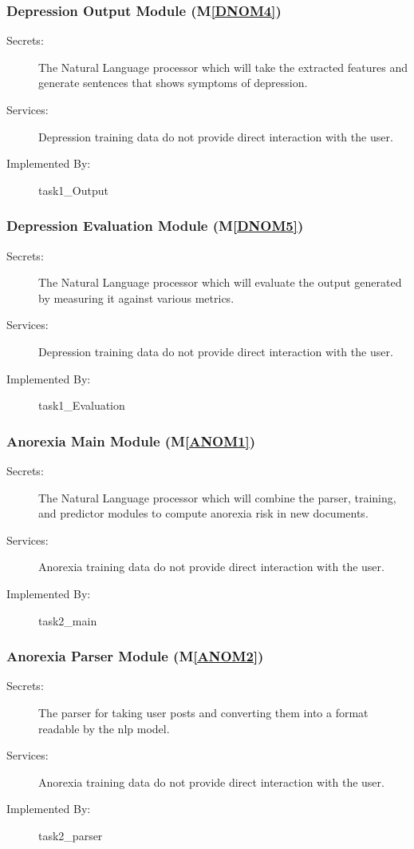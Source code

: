 \documentclass[12pt, titlepage]{article}
\newcommand{\mref}[1]{M\ref{#1}}
\begin{document}
\subsubsection{Depression Output Module (\mref{DNOM4})}
\begin{description}
\item[Secrets:]The Natural Language processor which will take the extracted features and generate sentences that shows symptoms of depression.
\item[Services:] Depression training data do not provide direct interaction with the user. 
\item[Implemented By:] task1\_Output
\end{description}

\subsubsection{Depression Evaluation Module (\mref{DNOM5})}
\begin{description}
\item[Secrets:]The Natural Language processor which will evaluate the output generated by measuring it against various metrics.
\item[Services:] Depression training data do not provide direct interaction with the user. 
\item[Implemented By:] task1\_Evaluation
\end{description}

\subsubsection{Anorexia Main Module (\mref{ANOM1})}
\begin{description}
\item[Secrets:] The Natural Language processor which will combine the parser, training, and predictor modules to compute anorexia risk in new documents.
\item[Services:] Anorexia training data
  do not provide direct interaction with the user. 
\item[Implemented By:] task2\_main
\end{description}

\subsubsection{Anorexia Parser Module (\mref{ANOM2})}
\begin{description}
\item[Secrets:] The parser for taking user posts and converting them into a format readable by the nlp model.
\item[Services:] Anorexia training data
  do not provide direct interaction with the user. 
\item[Implemented By:] task2\_parser
\end{description}
\end{document}
